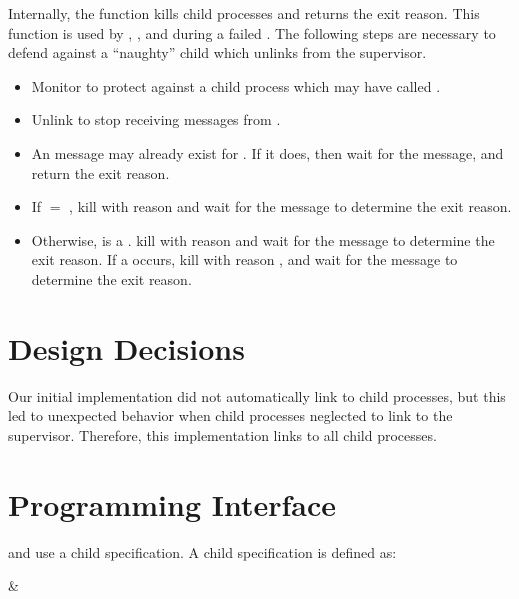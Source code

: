 Internally, the  function kills
child processes and returns the exit reason. This function is used by
, , and during a failed
. The following steps are necessary to defend against a
``naughty'' child which unlinks from the supervisor.

\antipar
\begin{itemize}
  \item Monitor  to protect against a child process
    which may have called .
  \item Unlink  to stop receiving  messages
    from .
  \item An  message may already exist for . If
    it does, then wait for the  message, and return the
    exit reason.
  \item If  $=$ , kill  with
    reason  and wait for the  message to
    determine the exit reason.
  \item Otherwise,  is a . kill  with
    reason  and wait for the  message to
    determine the exit reason. If a  occurs, kill
     with reason , and wait for the
     message to determine the exit reason.
\end{itemize}

\section {Design Decisions}

Our initial implementation did not automatically link to child
processes, but this led to unexpected behavior when child processes
neglected to link to the supervisor.  Therefore, this implementation
links to all child processes.

\section {Programming Interface}

 and 
use a child specification. A child specification is defined as:

\begin{grammar}
 & 
\end{grammar}

